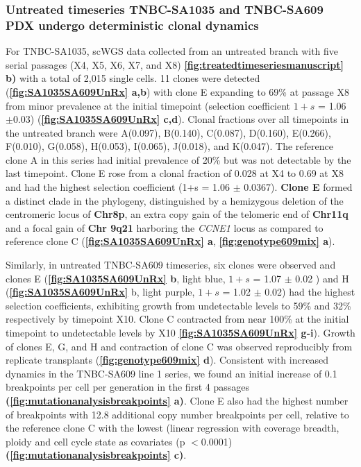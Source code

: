\subsubsection{Untreated timeseries TNBC-SA1035 and TNBC-SA609 PDX undergo deterministic clonal dynamics}
For TNBC-SA1035, scWGS data collected from an untreated branch with five serial passages (X4, X5, X6, X7, and X8) \textbf{\autoref{fig:treatedtimeseriesmanuscript} b)} with a total of 2,015 single cells. 11 clones were detected (\textbf{\autoref{fig:SA1035SA609UnRx} a,b}) with clone E expanding to 69\% at passage X8 from minor prevalence at the initial timepoint (selection coefficient $1+s$ = 1.06 $\pm$0.03) (\textbf{\autoref{fig:SA1035SA609UnRx} c,d}). Clonal fractions over all timepoints in the untreated branch were A(0.097), B(0.140), C(0.087), D(0.160), E(0.266), F(0.010), G(0.058), H(0.053), I(0.065), J(0.018), and K(0.047). The reference clone A in this series had initial prevalence of 20\% but was not detectable by the last timepoint. Clone E rose from a clonal fraction of 0.028 at X4 to 0.69 at X8 and had the highest selection coefficient (1+s = 1.06 $\pm$ 0.0367). \textbf{Clone E} formed a distinct clade in the phylogeny, distinguished by a hemizygous deletion of the centromeric locus of \textbf{Chr8p}, an extra copy gain of the telomeric end of \textbf{Chr11q} and a focal gain of \textbf{Chr 9q21} harboring the \textit{CCNE1} locus as compared to reference clone C (\textbf{\autoref{fig:SA1035SA609UnRx} a}, \textbf{\autoref{fig:genotype609mix} a}).

Similarly, in untreated TNBC-SA609 timeseries, six clones were observed and clones E (\textbf{\autoref{fig:SA1035SA609UnRx} b}, light blue, $1+s$ = 1.07 $\pm$ 0.02 ) and H (\textbf{\autoref{fig:SA1035SA609UnRx}} b, light purple, $1+s$ = 1.02 $\pm$ 0.02) had the highest selection coefficients, exhibiting growth from undetectable levels to 59\% and 32\% respectively by timepoint X10. Clone C contracted from near 100\% at the initial timepoint to undetectable levels by X10 \textbf{\autoref{fig:SA1035SA609UnRx} g-i}). Growth of clones E, G, and H and contraction of clone C was observed reproducibly from replicate transplants (\textbf{\autoref{fig:genotype609mix} d}).
Consistent with increased dynamics in the TNBC-SA609 line 1 series, we found an initial increase of 0.1 breakpoints per cell per generation in the first 4 passages \textbf{(\autoref{fig:mutationanalysisbreakpoints} a)}. Clone E also had the highest number of breakpoints with 12.8 additional copy number breakpoints per cell, relative to the reference clone C with the lowest (linear regression with coverage breadth, ploidy and cell cycle state as covariates (p $<$0.0001) \textbf{(\autoref{fig:mutationanalysisbreakpoints} c)}.

